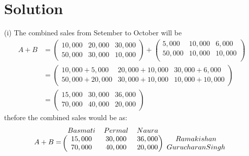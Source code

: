 \documentclass{article}
\begin{document}
\section*{Solution}
(i) The combined sales from Setember to October will be \\
\begin{equation*}
    \begin{split}
        A+B &= \begin{pmatrix}
        10,000 & 20,000& 30, 000\\
        50, 000 &30, 000 &10, 000 
        \end{pmatrix} + \begin{pmatrix}
        5,000 & 10,000& 6,000\\
50,000 &10,000 &10,000\\
        \end{pmatrix}\\
        &= \begin{pmatrix}
         10, 000+5,000 & 20, 000+10,000& 30, 000+6,000\\
        50, 000+20,000 &30, 000+10,000 &10, 000+10,000 
        \end{pmatrix}\\
        &= \begin{pmatrix}
        15,000 & 30,000 & 36,000\\
        70,000 & 40,000 & 20,000
        \end{pmatrix}
    \end{split}
\end{equation*}
thefore the combined sales would be as:
\[ A+B = 
\begin{blockarray}{cccc}
Basmati & Permal & Naura \\
\begin{block}{(ccc)c}
  15,000 & 30,000 & 36,000 & Ramakishan\\
70,000 & 40,000 & 20,000 & Gurucharan Singh\\
\end{block}
\end{blockarray}
 \]
\end{document}
